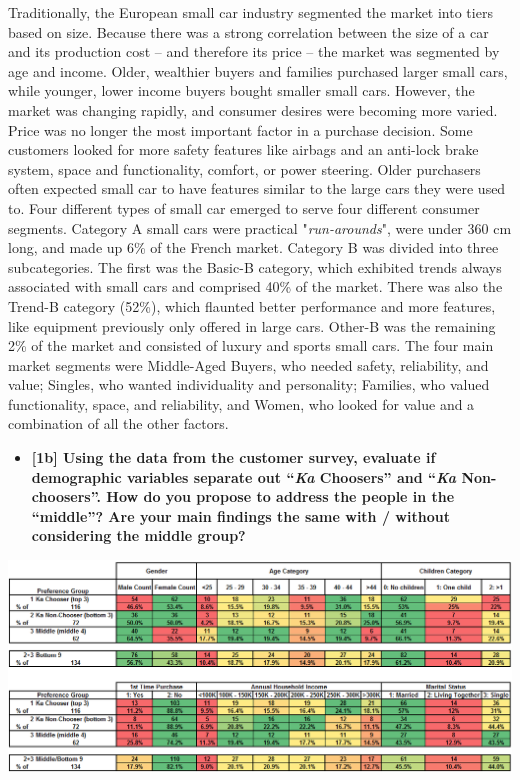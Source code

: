 \documentclass[10pt, oneside,spanish]{article}
\begin{document}
Traditionally, the European small car industry segmented the market into tiers based on size.  Because there was a strong correlation between the size of a car and its production cost – and therefore its price – the market was segmented by age and income.  Older, wealthier buyers and families purchased larger small cars, while younger, lower income buyers bought smaller small cars.  However, the market was changing rapidly, and consumer desires were becoming more varied.  Price was no longer the most important factor in a purchase decision.  Some customers looked for more safety features like airbags and an anti-lock brake system, space and functionality, comfort, or power steering.  Older purchasers often expected small car to have features similar to the large cars they were used to.  Four different types of small car emerged to serve four different consumer segments.  Category A small cars were practical "\textit{run-arounds}", were under 360 cm long, and made up 6\% of the French market.  Category B was divided into three subcategories.  The first was the Basic-B category, which exhibited trends always associated with small cars and comprised 40\% of the market.  There was also the Trend-B category (52\%), which flaunted better performance and more features, like equipment previously only offered in large cars.  Other-B was the remaining 2\% of the market and consisted of luxury and sports small cars.  The four main market segments were Middle-Aged Buyers, who needed safety, reliability, and value; Singles, who wanted individuality and personality; Families, who valued functionality, space, and reliability, and Women, who looked for value and a combination of all the other factors.       



\medskip


\pagebreak


\begin{itemize}
\item \textbf{[1b] Using the data from the customer survey, evaluate if demographic variables separate out “\textit{Ka} Choosers” and “\textit{Ka} Non-choosers”. How do you propose to address the people in the “middle”? Are your main findings the same with / without considering the middle group?}
\end{itemize}

\begin{center}
\includegraphics[width=15cm]{1b1.PNG}
\end{center}
\end{document}
